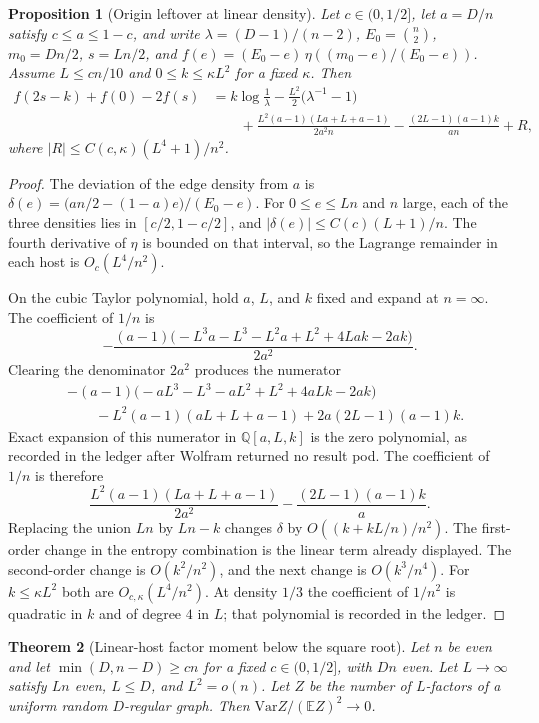 \documentclass[11pt]{article}
\newtheorem{theorem}{Theorem}
\newtheorem{proposition}[theorem]{Proposition}
\newcommand{\EE}{\mathbb{E}}
\newcommand{\Var}{\mathrm{Var}}
\begin{document}
\begin{proposition}[Origin leftover at linear density]
\label{prop:origin-linear}
Let \(c\in(0,1/2]\), let \(a=D/n\) satisfy \(c\le a\le 1-c\), and write
\(\lambda=(D-1)/(n-2)\), \(E_0=\binom{n}{2}\), \(m_0=Dn/2\), \(s=Ln/2\), and
\(f(e)=(E_0-e)\,\eta((m_0-e)/(E_0-e))\).
Assume \(L\le cn/10\) and \(0\le k\le\kappa L^2\) for a fixed \(\kappa\). Then
\[
\begin{aligned}
f(2s-k)+f(0)-2f(s)
&=
k\log\frac1\lambda-\frac{L^2}{2}\bigl(\lambda^{-1}-1\bigr)\\
&\qquad
+\frac{L^2(a-1)(La+L+a-1)}{2a^2 n}
-\frac{(2L-1)(a-1)k}{an}
+R,
\end{aligned}
\]
where \(|R|\le C(c,\kappa)(L^4+1)/n^2\).
\end{proposition}

\begin{proof}
The deviation of the edge density from \(a\) is
\(\delta(e)=\bigl(an/2-(1-a)e\bigr)/(E_0-e)\).
For \(0\le e\le Ln\) and \(n\) large, each of the three densities lies in
\([c/2,1-c/2]\), and \(|\delta(e)|\le C(c)(L+1)/n\).
The fourth derivative of \(\eta\) is bounded on that interval, so the Lagrange
remainder in each host is \(O_c(L^4/n^2)\).

On the cubic Taylor polynomial, hold \(a\), \(L\), and \(k\) fixed and expand
at \(n=\infty\). The coefficient of \(1/n\) is
\[
-\frac{(a-1)\bigl(-L^3 a-L^3-L^2 a+L^2+4Lak-2ak\bigr)}{2a^2}.
\]
Clearing the denominator \(2a^2\) produces the numerator
\begin{align*}
&-(a-1)\bigl(-a L^3-L^3-a L^2+L^2+4a Lk-2ak\bigr)\\
&\qquad
-L^2(a-1)(aL+L+a-1)+2a(2L-1)(a-1)k.
\end{align*}
Exact expansion of this numerator in \(\mathbb{Q}[a,L,k]\) is the zero
polynomial, as recorded in the ledger after Wolfram returned no result pod.
The coefficient of \(1/n\) is therefore
\[
\frac{L^2(a-1)(La+L+a-1)}{2a^2}-\frac{(2L-1)(a-1)k}{a}.
\]
Replacing the union \(Ln\) by \(Ln-k\) changes \(\delta\) by \(O((k+kL/n)/n^2)\).
The first-order change in the entropy combination is the linear term already
displayed. The second-order change is \(O(k^2/n^2)\), and the next change is
\(O(k^3/n^4)\). For \(k\le\kappa L^2\) both are \(O_{c,\kappa}(L^4/n^2)\).
At density \(1/3\) the coefficient of \(1/n^2\) is quadratic in \(k\) and of
degree \(4\) in \(L\); that polynomial is recorded in the ledger.
\end{proof}

\begin{theorem}[Linear-host factor moment below the square root]
\label{thm:linear-below-sqrt}
Let \(n\) be even and let \(\min(D,n-D)\ge cn\) for a fixed \(c\in(0,1/2]\),
with \(Dn\) even. Let \(L\to\infty\) satisfy \(Ln\) even, \(L\le D\), and
\(L^2=o(n)\).
Let \(Z\) be the number of \(L\)-factors of a uniform random \(D\)-regular graph.
Then \(\Var Z/(\EE Z)^2\to 0\).
\end{theorem}
\end{document}
